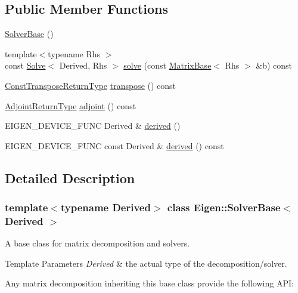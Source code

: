 \subsection*{Public Member Functions}
\begin{DoxyCompactItemize}
\item 
\mbox{\hyperlink{class_eigen_1_1_solver_base_a4d5e5baddfba3790ab1a5f247dcc4dc1}{Solver\+Base}} ()
\item 
{\footnotesize template$<$typename Rhs $>$ }\\const \mbox{\hyperlink{class_eigen_1_1_solve}{Solve}}$<$ Derived, Rhs $>$ \mbox{\hyperlink{class_eigen_1_1_solver_base_a7fd647d110487799205df6f99547879d}{solve}} (const \mbox{\hyperlink{class_eigen_1_1_matrix_base}{Matrix\+Base}}$<$ Rhs $>$ \&b) const
\item 
\mbox{\hyperlink{class_eigen_1_1_transpose}{Const\+Transpose\+Return\+Type}} \mbox{\hyperlink{class_eigen_1_1_solver_base_a732e75b5132bb4db3775916927b0e86c}{transpose}} () const
\item 
\mbox{\hyperlink{struct_eigen_1_1internal_1_1true__type}{Adjoint\+Return\+Type}} \mbox{\hyperlink{class_eigen_1_1_solver_base_a05a3686a89888681c8e0c2bcab6d1ce5}{adjoint}} () const
\item 
E\+I\+G\+E\+N\+\_\+\+D\+E\+V\+I\+C\+E\+\_\+\+F\+U\+NC Derived \& \mbox{\hyperlink{class_eigen_1_1_solver_base_a324b16961a11d2ecfd2d1b7dd7946545}{derived}} ()
\item 
E\+I\+G\+E\+N\+\_\+\+D\+E\+V\+I\+C\+E\+\_\+\+F\+U\+NC const Derived \& \mbox{\hyperlink{class_eigen_1_1_solver_base_ad0cbee5e2dfef3bbe9db5e6d5fe12cc0}{derived}} () const
\end{DoxyCompactItemize}


\subsection{Detailed Description}
\subsubsection*{template$<$typename Derived$>$\newline
class Eigen\+::\+Solver\+Base$<$ Derived $>$}

A base class for matrix decomposition and solvers. 


\begin{DoxyTemplParams}{Template Parameters}
{\em Derived} & the actual type of the decomposition/solver.\\
\hline
\end{DoxyTemplParams}
Any matrix decomposition inheriting this base class provide the following A\+PI\+:


